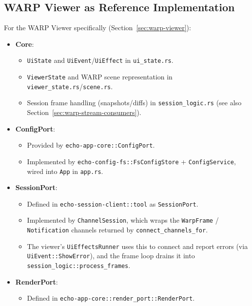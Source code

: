 \subsection{WARP Viewer as Reference Implementation}

For the WARP Viewer specifically (Section~\ref{sec:warp-viewer}):

\begin{itemize}
  \item \textbf{Core}:
    \begin{itemize}
      \item \texttt{UiState} and \texttt{UiEvent}/\texttt{UiEffect} in
            \texttt{ui\_state.rs}.
      \item \texttt{ViewerState} and WARP scene representation in
            \texttt{viewer\_state.rs}/\texttt{scene.rs}.
      \item Session frame handling (snapshots/diffs) in
            \texttt{session\_logic.rs} (see also
            Section~\ref{sec:warp-stream-consumers}).
    \end{itemize}
  \item \textbf{ConfigPort}:
    \begin{itemize}
      \item Provided by \texttt{echo-app-core::ConfigPort}.
      \item Implemented by \texttt{echo-config-fs::FsConfigStore} +
            \texttt{ConfigService}, wired into \texttt{App} in
            \texttt{app.rs}.
    \end{itemize}
  \item \textbf{SessionPort}:
    \begin{itemize}
      \item Defined in \texttt{echo-session-client::tool} as
            \texttt{SessionPort}.
      \item Implemented by \texttt{ChannelSession}, which wraps the
            \texttt{WarpFrame} / \texttt{Notification} channels returned by
            \texttt{connect\_channels\_for}.
      \item The viewer’s \texttt{UiEffectsRunner} uses this to connect and
            report errors (via \texttt{UiEvent::ShowError}), and the frame loop
            drains it into \texttt{session\_logic::process\_frames}.
    \end{itemize}
  \item \textbf{RenderPort}:
    \begin{itemize}
      \item Defined in \texttt{echo-app-core::render\_port::RenderPort}.

\end{itemize}
\end{itemize}

